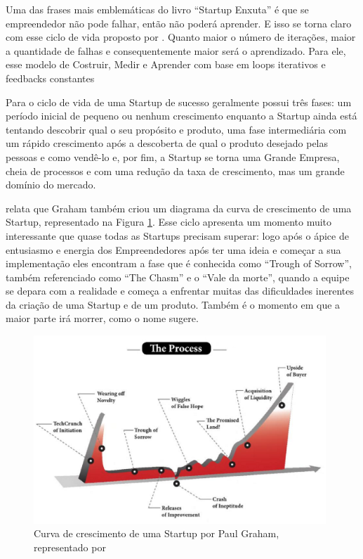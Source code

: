 Uma das frases mais emblemáticas do livro ``Startup Enxuta'' é que se empreendedor não pode falhar, então não poderá aprender. E isso se torna claro com esse ciclo de vida proposto por . Quanto maior o número de iterações, maior a quantidade de falhas e consequentemente maior será o aprendizado. Para ele, esse modelo de Costruir, Medir e Aprender com base em loops iterativos e feedbacks constantes

Para  o ciclo de vida de uma Startup de sucesso geralmente possui três fases: um período inicial de pequeno ou nenhum crescimento enquanto a Startup ainda está tentando descobrir qual o seu propósito e produto, uma fase intermediária com um rápido crescimento após a descoberta de qual o produto desejado pelas pessoas e como vendê-lo e, por fim, a Startup se torna uma Grande Empresa, cheia de processos e com uma redução da taxa de crescimento, mas um grande domínio do mercado.

 relata que Graham também criou um diagrama da curva de crescimento de uma Startup, representado na Figura \ref{figure:startup_curve_by_graham}. Esse ciclo apresenta um momento muito interessante que quase todas as Startups precisam superar: logo após o ápice de entusiasmo e energia dos Empreendedores após ter uma ideia e começar a sua implementação eles encontram a fase que é conhecida como ``Trough of Sorrow'', também referenciado como ``The Chasm'' e o ``Vale da morte'', quando a equipe se depara com a realidade e começa a enfrentar muitas das dificuldades inerentes da criação de uma Startup e de um produto. Também é o momento em que a maior parte irá morrer, como o nome sugere.

\begin{figure}[!htb]
\centering
\includegraphics[width=11cm,angle=0]{figuras/startup_curve_by_graham}
\caption{Curva de crescimento de uma Startup por Paul Graham, representado por \cite{Polgar2015}}
\label{figure:startup_curve_by_graham}
\end{figure}

